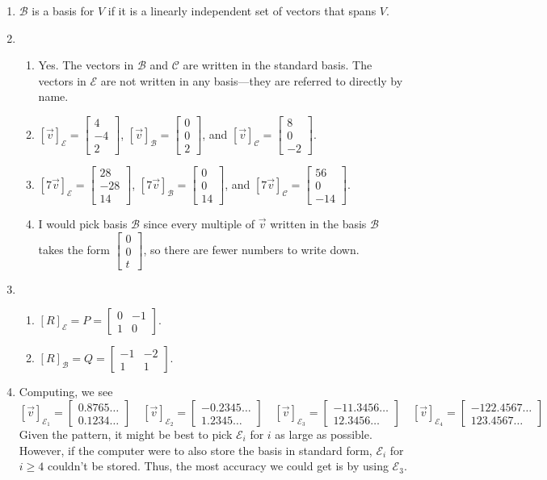 \documentclass[red]{tutorial}
\newcommand{\mat}[1]{\begin{bmatrix}#1\end{bmatrix}}
\theoremstyle{definition}
\theoremstyle{theorem}
\begin{document}
	\begin{solutions}
		\begin{enumerate}
			\item $\mathcal B$ is a basis for $V$ if it is a linearly independent set of
				vectors that spans $V$.
			\item \begin{enumerate}
					\item Yes. The vectors in $\mathcal B$ and $\mathcal C$ are written in
						the standard basis. The vectors in $\mathcal E$ are not written in
						any basis---they are referred to directly by name.
					\item $[\vec v]_{\mathcal E} = \mat{4\\-4\\2}$,
						$[\vec v]_{\mathcal B} = \mat{0\\0\\2}$, and
						$[\vec v]_{\mathcal C} = \mat{8\\0\\-2}$.
					\item $[7\vec v]_{\mathcal E} = \mat{28\\-28\\14}$,
						$[7\vec v]_{\mathcal B} = \mat{0\\0\\14}$, and
						$[7\vec v]_{\mathcal C} = \mat{56\\0\\-14}$.
					\item I would pick basis $\mathcal B$ since every multiple of $\vec v$ written
						in the basis $\mathcal B$ takes the form $\mat{0\\0\\t}$, so there are
						fewer numbers to write down.

			\end{enumerate}
			\item \begin{enumerate}
					\item $[R]_{\mathcal E} = P=\mat{0&-1\\1&0}$.
					\item $[R]_{\mathcal B} = Q=\mat{-1&-2\\1&1}$.
			\end{enumerate}

			\item Computing, we see
				\[
					[\vec v]_{\mathcal E_1} = \mat{0.8765\ldots\\0.1234\ldots}\quad
					[\vec v]_{\mathcal E_2} = \mat{-0.2345\ldots\\1.2345\ldots}\quad
					[\vec v]_{\mathcal E_3} = \mat{-11.3456\ldots\\12.3456\ldots}\quad
					[\vec v]_{\mathcal E_4} = \mat{-122.4567\ldots\\123.4567\ldots}
				\]
			Given the pattern, it might be best to pick $\mathcal E_i$ for $i$ as large as possible.
				However, if the computer were to also store the basis in standard form, 
				$\mathcal E_i$ for $i\geq 4$ couldn't be stored. Thus, the most accuracy we
				could get is by using $\mathcal E_3$.
		\end{enumerate}
	
	\end{solutions}
\end{document}
